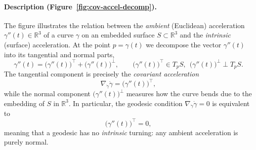 \documentclass[12pt,a4paper]{article}
\theoremstyle{plain}
\theoremstyle{definition}      %
\begin{document}
\paragraph{Description (Figure~\ref{fig:cov-accel-decomp}).}
The figure illustrates the relation between the \emph{ambient} (Euclidean) acceleration
$\gamma''(t)\in\mathbb{R}^3$ of a curve $\gamma$ on an embedded surface $S\subset\mathbb{R}^3$
and the \emph{intrinsic} (surface) acceleration.
At the point $p=\gamma(t)$ we decompose the vector $\gamma''(t)$ into its tangential and normal parts,
\[
\gamma''(t)=\bigl(\gamma''(t)\bigr)^{\top}+\bigl(\gamma''(t)\bigr)^{\perp},
\qquad
\bigl(\gamma''(t)\bigr)^{\top}\in T_pS,\ \ \bigl(\gamma''(t)\bigr)^{\perp}\perp T_pS.
\]
The tangential component is precisely the \emph{covariant acceleration}
\[
\nabla_{\dot\gamma}\dot\gamma=\bigl(\gamma''(t)\bigr)^{\top},
\]
while the normal component $\bigl(\gamma''(t)\bigr)^{\perp}$ measures how the curve bends due to the embedding of
$S$ in $\mathbb{R}^3$.
In particular, the geodesic condition $\nabla_{\dot\gamma}\dot\gamma=0$ is equivalent to
\[
\bigl(\gamma''(t)\bigr)^{\top}=0,
\]
meaning that a geodesic has no \emph{intrinsic} turning: any ambient acceleration is purely normal.



\end{document}
